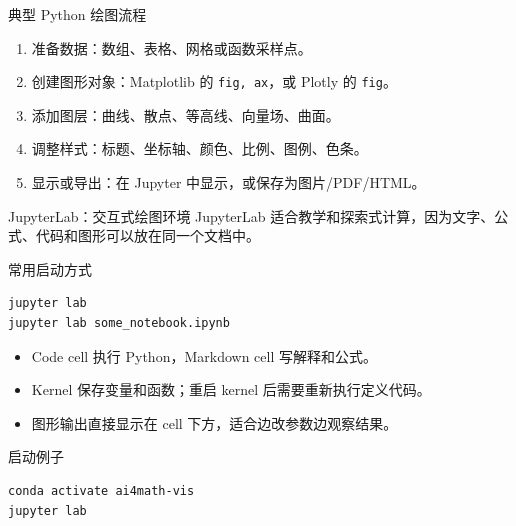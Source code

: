 \documentclass[aspectratio=169,11pt]{ctexbeamer}
\begin{document}
\begin{frame}{典型 Python 绘图流程}
  \begin{enumerate}
    \item 准备数据：数组、表格、网格或函数采样点。
    \item 创建图形对象：Matplotlib 的 \texttt{fig, ax}，或 Plotly 的 \texttt{fig}。
    \item 添加图层：曲线、散点、等高线、向量场、曲面。
    \item 调整样式：标题、坐标轴、颜色、比例、图例、色条。
    \item 显示或导出：在 Jupyter 中显示，或保存为图片/PDF/HTML。
  \end{enumerate}
\end{frame}

\begin{frame}[fragile]{JupyterLab：交互式绘图环境}
  JupyterLab 适合教学和探索式计算，因为文字、公式、代码和图形可以放在同一个文档中。

  \begin{block}{常用启动方式}
\begin{Verbatim}[fontsize=\small]
jupyter lab
jupyter lab some_notebook.ipynb
\end{Verbatim}
  \end{block}

  \begin{itemize}
    \item Code cell 执行 Python，Markdown cell 写解释和公式。
    \item Kernel 保存变量和函数；重启 kernel 后需要重新执行定义代码。
    \item 图形输出直接显示在 cell 下方，适合边改参数边观察结果。
  \end{itemize}

  \begin{block}{启动例子}
\begin{Verbatim}[fontsize=\small]
conda activate ai4math-vis
jupyter lab
\end{Verbatim}
  \end{block}

\end{frame}
\end{document}
